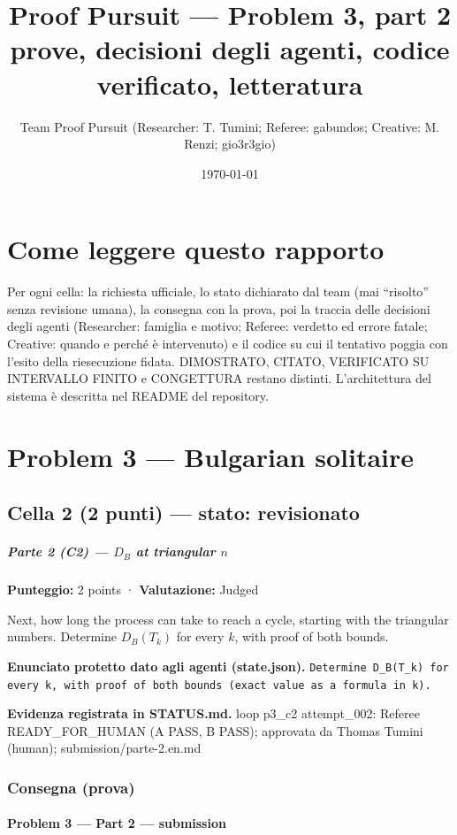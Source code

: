 \documentclass[11pt,a4paper]{article}
\title{Proof Pursuit --- Problem 3, part 2\\ \large prove, decisioni degli agenti, codice verificato, letteratura}
\author{Team Proof Pursuit (Researcher: T. Tumini; Referee: gabundos; Creative: M. Renzi; gio3r3gio)}
\date{\today}
\begin{document}
\maketitle\tableofcontents
\section*{Come leggere questo rapporto}
Per ogni cella: la richiesta ufficiale, lo stato dichiarato dal team (mai ``risolto'' senza revisione umana), la consegna
con la prova, poi la traccia delle decisioni degli agenti (Researcher: famiglia e motivo; Referee: verdetto ed errore
fatale; Creative: quando e perché è intervenuto) e il codice su cui il tentativo poggia con l'esito della riesecuzione
fidata. DIMOSTRATO, CITATO, VERIFICATO SU INTERVALLO FINITO e CONGETTURA restano distinti. L'architettura del sistema
è descritta nel README del repository.
\section{Problem 3 — Bulgarian solitaire}
\subsection{Cella 2 (2 punti) — stato: revisionato}
\subparagraph{\texorpdfstring{Parte 2 (C2) --- \(D_B\) at triangular
\(n\)}{Parte 2 (C2) --- D\_B at triangular n}}\label{parte-2-c2-d_b-at-triangular-n}

\textbf{Punteggio:} 2 points · \textbf{Valutazione:} Judged

Next, how long the process can take to reach a cycle, starting with the
triangular numbers. Determine \(D_B(T_k)\) for every \(k\), with proof
of both bounds.

\textbf{Enunciato protetto dato agli agenti (state.json).} \texttt{Determine D\_B(T\_k) for every k, with proof of both bounds (exact value as a formula in k).}

\textbf{Evidenza registrata in STATUS.md.} loop p3\_c2 attempt\_002: Referee READY\_FOR\_HUMAN (A PASS, B PASS); approvata da Thomas Tumini (human); submission/parte-2.en.md

\subsubsection{Consegna (prova)}
\paragraph{Problem 3 --- Part 2 ---
submission}\label{problem-3-part-2-submission}
\end{document}
